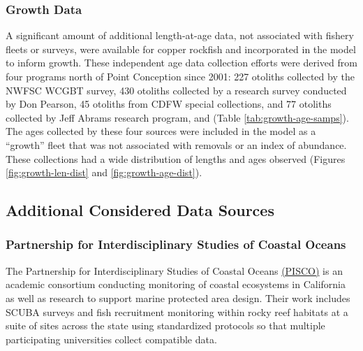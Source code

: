 \documentclass[11pt,
  english,
  letterpaper,
]{article}
\begin{document}
\hypertarget{growth-data}{%
\subsubsection{Growth Data}\label{growth-data}}

A significant amount of additional length-at-age data, not associated with fishery fleets or surveys, were available for copper rockfish and incorporated in the model to inform growth. These independent age data collection efforts were derived from four programs north of Point Conception since 2001: 227 otoliths collected by the NWFSC WCGBT survey, 430 otoliths collected by a research survey conducted by Don Pearson, 45 otoliths from CDFW special collections, and 77 otoliths collected by Jeff Abrams research program, and (Table \ref{tab:growth-age-samps}). The ages collected by these four sources were included in the model as a ``growth'' fleet that was not associated with removals or an index of abundance. These collections had a wide distribution of lengths and ages observed (Figures \ref{fig:growth-len-dist} and \ref{fig:growth-age-dist}).

\hypertarget{additional-considered-data-sources}{%
\subsection{Additional Considered Data Sources}\label{additional-considered-data-sources}}

\hypertarget{partnership-for-interdisciplinary-studies-of-coastal-oceans}{%
\subsubsection{Partnership for Interdisciplinary Studies of Coastal Oceans}\label{partnership-for-interdisciplinary-studies-of-coastal-oceans}}

The Partnership for Interdisciplinary Studies of Coastal Oceans \href{https://www.piscoweb.org/}{(PISCO)} is an academic consortium conducting monitoring of coastal ecosystems in California as well as research to support marine protected area design. Their work includes SCUBA surveys and fish recruitment monitoring within rocky reef habitats at a suite of sites across the state using standardized protocols so that multiple participating universities collect compatible data.
\end{document}
